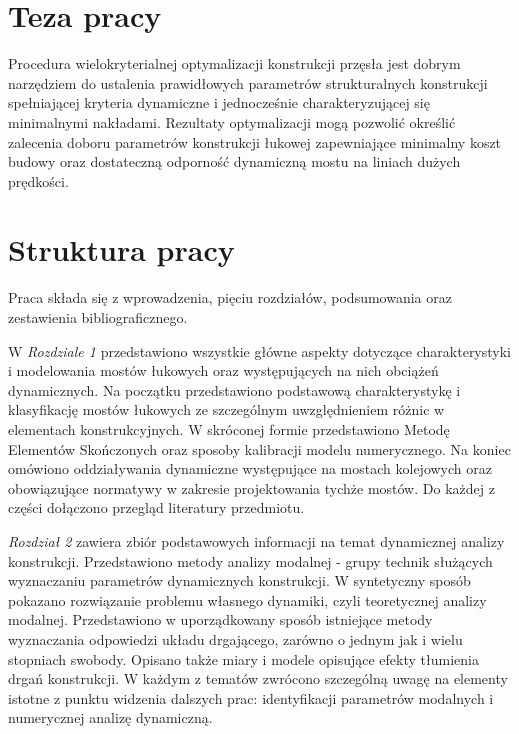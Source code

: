 \section*{Teza pracy}

Procedura wielokryterialnej optymalizacji konstrukcji przęsła jest dobrym narzędziem do ustalenia prawidłowych parametrów strukturalnych konstrukcji spełniającej kryteria dynamiczne i jednocześnie charakteryzującej się minimalnymi nakładami. Rezultaty optymalizacji mogą pozwolić określić zalecenia doboru parametrów konstrukcji łukowej zapewniające minimalny koszt budowy oraz dostateczną odporność dynamiczną mostu na liniach dużych prędkości.




\section*{Struktura pracy}
Praca składa się z wprowadzenia, pięciu rozdziałów, podsumowania oraz zestawienia bibliograficznego. 

W \textit{Rozdziale 1} przedstawiono wszystkie główne aspekty dotyczące charakterystyki i modelowania mostów łukowych oraz występujących na nich obciążeń dynamicznych. Na początku przedstawiono podstawową charakterystykę i klasyfikację mostów łukowych ze szczególnym uwzględnieniem różnic w elementach konstrukcyjnych. W skróconej formie przedstawiono Metodę Elementów Skończonych oraz sposoby kalibracji modelu numerycznego. Na koniec omówiono oddziaływania dynamiczne występujące na mostach kolejowych oraz obowiązujące normatywy w zakresie projektowania tychże mostów. Do każdej z części dołączono przegląd literatury przedmiotu.

\textit{Rozdział 2} zawiera zbiór podstawowych informacji na temat dynamicznej analizy konstrukcji. Przedstawiono metody analizy modalnej - grupy technik służących wyznaczaniu parametrów dynamicznych konstrukcji. W syntetyczny sposób pokazano rozwiązanie problemu własnego dynamiki, czyli teoretycznej analizy modalnej. Przedstawiono w uporządkowany sposób istniejące metody wyznaczania odpowiedzi układu drgającego, zarówno o jednym jak i wielu stopniach swobody. Opisano także miary i modele opisujące efekty tłumienia drgań konstrukcji. W każdym z tematów zwrócono szczególną uwagę na elementy istotne z punktu widzenia dalszych prac: identyfikacji parametrów modalnych i numerycznej analizę dynamiczną.

